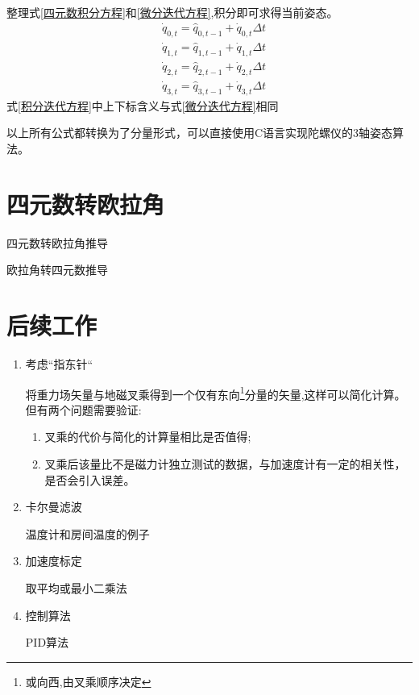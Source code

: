 \begin{enumerate}
        整理式\ref{四元数积分方程}和\ref{微分迭代方程},积分即可求得当前姿态。
        \begin{equation} \label{积分迭代方程}
            \begin{aligned} 
                &\dot{q}_{0,t} = \hat{q}_{0,t-1} + \dot{q}_{0,t} \Delta t \\
                &\dot{q}_{1,t} = \hat{q}_{1,t-1} + \dot{q}_{1,t} \Delta t \\
                &\dot{q}_{2,t} = \hat{q}_{2,t-1} + \dot{q}_{2,t} \Delta t \\
                &\dot{q}_{3,t} = \hat{q}_{3,t-1} + \dot{q}_{3,t} \Delta t
            \end{aligned}
        \end{equation} 
        式\ref{积分迭代方程}中上下标含义与式\ref{微分迭代方程}相同
\end{enumerate}

以上所有公式都转换为了分量形式，可以直接使用C语言实现陀螺仪的3轴姿态算法。

\section{四元数转欧拉角}
四元数转欧拉角推导

欧拉角转四元数推导

\section{后续工作}
\begin{enumerate}
    \item 考虑“指东针“

        将重力场矢量与地磁叉乘得到一个仅有东向\footnote{或向西,由叉乘顺序决定}分量的矢量,这样可以简化计算。但有两个问题需要验证:
        \begin{enumerate}
            \item 叉乘的代价与简化的计算量相比是否值得;
            \item 叉乘后该量比不是磁力计独立测试的数据，与加速度计有一定的相关性，是否会引入误差。
        \end{enumerate} 
    \item 卡尔曼滤波

        温度计和房间温度的例子
    \item 加速度标定

        取平均或最小二乘法
    \item 控制算法

        PID算法
\end{enumerate}


